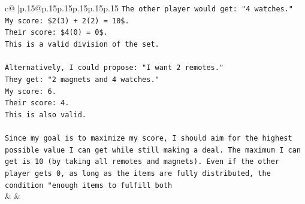 \documentclass{article}
\begin{document}
{\begin{supertabular}{c@{$\;$}|p{.15\linewidth}@{}p{.15\linewidth}p{.15\linewidth}p{.15\linewidth}p{.15\linewidth}p{.15\linewidth}}
{{{\texttt{The other player would get: "4 watches."} \\
\texttt{My score: \$2(3) + 2(2) = 10\$.} \\
\texttt{Their score: \$4(0) = 0\$.} \\
\texttt{This is a valid division of the set.} \\
\\ 
\texttt{Alternatively, I could propose: "I want 2 remotes."} \\
\texttt{They get: "2 magnets and 4 watches."} \\
\texttt{My score: 6.} \\
\texttt{Their score: 4.} \\
\texttt{This is also valid.} \\
\\ 
\texttt{Since my goal is to maximize my score, I should aim for the highest possible value I can get while still making a deal. The maximum I can get is 10 (by taking all remotes and magnets). Even if the other player gets 0, as long as the items are fully distributed, the condition "enough items to fulfill both} \\
            }
        }
    }
    & & \\ \\


\end{supertabular}}
\end{document}
